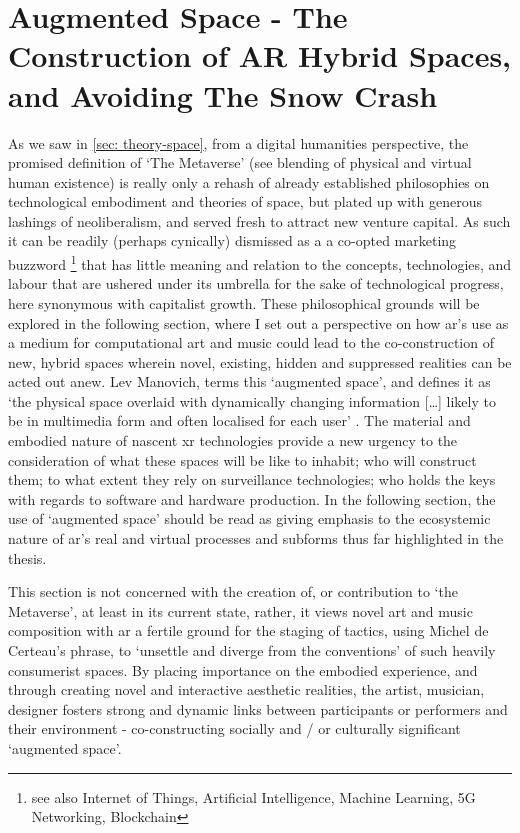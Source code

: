 \section[Augmented Space]{Augmented Space - The Construction of AR Hybrid Spaces, and Avoiding The Snow Crash}\label{sec: discussion-medium-space}
As we saw in \autoref{sec: theory-space}, from a digital humanities perspective, the promised definition of `The Metaverse' (see blending of physical and virtual human existence) is really only a rehash of already established philosophies on technological embodiment and theories of space, but plated up with generous lashings of neoliberalism, and served fresh to attract new venture capital. As such it can be readily (perhaps cynically) dismissed as a a co-opted marketing buzzword \footnote{see also Internet of Things, Artificial Intelligence, Machine Learning, 5G Networking, Blockchain} that has little meaning and relation to the concepts, technologies, and labour that are ushered under its umbrella for the sake of technological progress, here synonymous with capitalist growth. These philosophical grounds will be explored in the following section, where I set out a perspective on how \gls{ar}'s use as a medium for computational art and music could lead to the co-construction of new, hybrid spaces wherein novel, existing, hidden and suppressed realities can be acted out anew. Lev Manovich, terms this `augmented space', and defines it as `the physical space overlaid with dynamically changing information […] likely to be in multimedia form and often localised for each user' \citep[p. 2]{manovich2006}. The material and embodied nature of nascent \gls{xr} technologies provide a new urgency to the consideration of what these spaces will be like to inhabit; who will construct them; to what extent they rely on surveillance technologies; who holds the keys with regards to software and hardware production. In the following section, the use of `augmented space' should be read as giving emphasis to the ecosystemic nature of \gls{ar}'s real and virtual processes and subforms thus far highlighted in the thesis. 

This section is not concerned with the creation of, or contribution to `the Metaverse', at least in its current state, rather, it views novel art and music composition with \gls{ar} a fertile ground for the staging of tactics, using Michel de Certeau's phrase, to `unsettle and diverge from the conventions' \citeyearpar[p. 36]{decerteau1984} of such heavily consumerist spaces. By placing importance on the embodied experience, and through creating novel and interactive aesthetic realities, the artist, musician, designer fosters strong and dynamic links between participants or performers and their environment - co-constructing socially and / or culturally significant `augmented space'.

